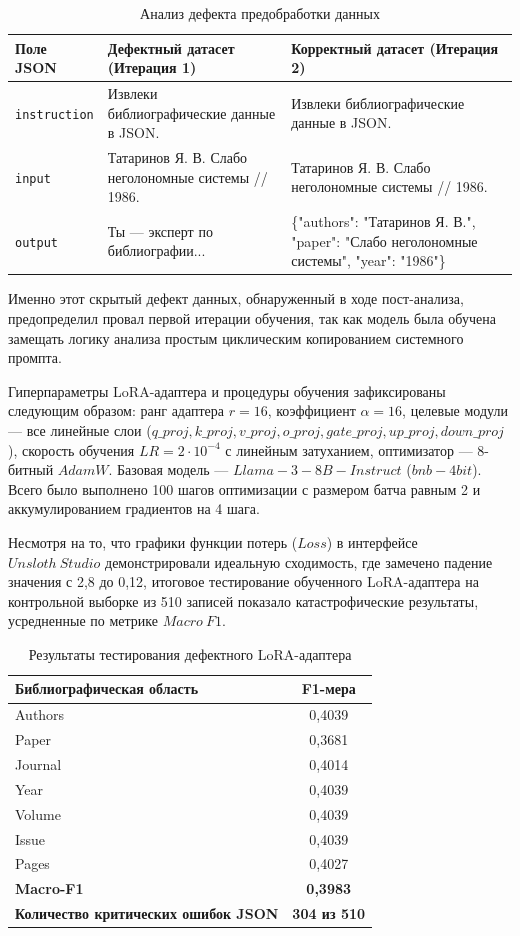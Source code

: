 \begin{table}[h!]
\centering
\caption{Анализ дефекта предобработки данных}
\label{tab:dataset_error}
\begin{tabular}{|l|p{5cm}|p{5cm}|}
\hline
\textbf{Поле JSON} & \textbf{Дефектный датасет (Итерация 1)} & \textbf{Корректный датасет (Итерация 2)} \\ \hline
\texttt{instruction} & Извлеки библиографические данные в JSON. & Извлеки библиографические данные в JSON. \\ \hline
\texttt{input} & Татаринов Я. В. Слабо неголономные системы // 1986. & Татаринов Я. В. Слабо неголономные системы // 1986. \\ \hline
\texttt{output} & Ты — эксперт по библиографии... & \{"authors": "Татаринов Я. В.", "paper": "Слабо неголономные системы", "year": "1986"\} \\ \hline
\end{tabular}
\end{table}

Именно этот скрытый дефект данных, обнаруженный в ходе пост-анализа, предопределил провал первой итерации обучения, так как модель была обучена замещать логику анализа простым циклическим копированием системного промпта.

Гиперпараметры LoRA-адаптера и процедуры обучения зафиксированы следующим образом: ранг адаптера $r = 16$, коэффициент $\alpha = 16$, целевые модули — все линейные слои ($q\_proj, k\_proj, v\_proj, o\_proj, gate\_proj, up\_proj, down\_proj$), скорость обучения $LR = 2\cdot 10^{-4}$ с линейным затуханием, оптимизатор — 8-битный $AdamW$. Базовая модель — $Llama-3-8B-Instruct$ ($bnb-4bit$). Всего было выполнено 100 шагов оптимизации с размером батча равным 2 и аккумулированием градиентов на 4 шага.

Несмотря на то, что графики функции потерь ($Loss$) в интерфейсе $Unsloth\ Studio$ демонстрировали идеальную сходимость, где замечено падение значения с 2,8 до 0,12, итоговое тестирование обученного LoRA-адаптера на контрольной выборке из 510 записей показало катастрофические результаты, усредненные по метрике $Macro\ F1$.

\begin{table}[h!]
\centering
\caption{Результаты тестирования дефектного LoRA-адаптера}
\label{tab:bad_results}
\begin{tabular}{|l|c|}
\hline
\textbf{Библиографическая область} & \textbf{F1-мера} \\ \hline
Authors & 0,4039 \\ \hline
Paper & 0,3681 \\ \hline
Journal & 0,4014 \\ \hline
Year & 0,4039 \\ \hline
Volume & 0,4039 \\ \hline
Issue & 0,4039 \\ \hline
Pages & 0,4027 \\ \hline \hline
\textbf{Macro-F1} & \textbf{0,3983} \\ \hline
\textbf{Количество критических ошибок JSON} & \textbf{304 из 510} \\ \hline
\end{tabular}
\end{table}

